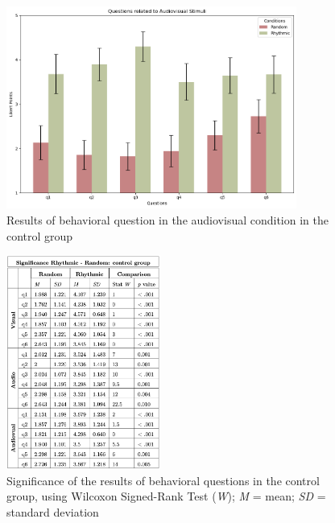 \begin{figure}[H]
    \centering
    \includegraphics[width=0.85\textwidth]{bar_plots/plotbar_audiovisual_h.png}
    \caption{Results of behavioral question in the audiovisual condition in the control group}
    \label{fig: bar_audiovisual_control} 
\end{figure} 
\begin{figure}[H]
    \centering
    \includegraphics[width=0.45\textwidth]{significance_tables/control_group.png}
    \caption{Significance of the results of behavioral questions in the control group, using Wilcoxon Signed-Rank Test (\textit{W}); \textit{M} = mean; \textit{SD} = standard deviation}
    \label{fig: significance_control_pop} 
\end{figure} 

\clearpage
